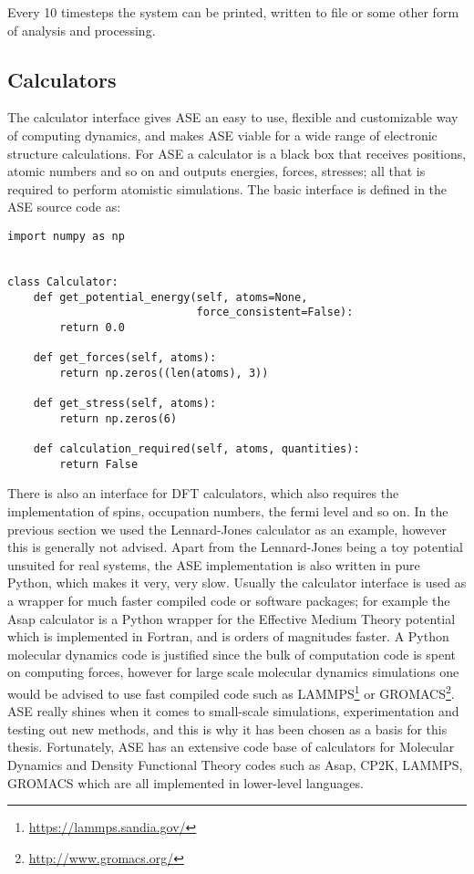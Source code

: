 Every 10 timesteps the system can be printed, written to file
or some other form of analysis and processing.

\subsection{Calculators}
The calculator interface gives ASE an easy to use,
flexible and customizable way of computing dynamics,
and makes ASE viable for a wide range of electronic structure calculations.
For ASE a calculator is a black box that receives positions, atomic
numbers and so on and outputs energies, forces, stresses;
all that is required to perform atomistic simulations.
The basic interface is defined in the ASE source code as:

\begin{verbatim}
import numpy as np


class Calculator:
    def get_potential_energy(self, atoms=None, 
                             force_consistent=False):
        return 0.0

    def get_forces(self, atoms):
        return np.zeros((len(atoms), 3))

    def get_stress(self, atoms):
        return np.zeros(6)

    def calculation_required(self, atoms, quantities):
        return False
\end{verbatim}

There is also an interface for DFT calculators, which also
requires the implementation of spins, occupation numbers,
the fermi level and so on.
\newline
\newline
In the previous section we used the Lennard-Jones calculator
as an example, however this is generally not advised.
Apart from the Lennard-Jones being a toy potential unsuited
for real systems, the ASE implementation is also written in pure
Python, which makes it very, very slow.
Usually the calculator interface is used as a wrapper for much faster
compiled code or software packages; for example the
Asap calculator is a Python wrapper for the Effective Medium Theory
potential which is implemented in Fortran, and is orders of magnitudes
faster. A Python molecular dynamics code is justified
since the bulk of computation code is spent on computing forces,
however for large scale molecular dynamics simulations
one would be advised to use fast compiled code such as LAMMPS\footnote{
\url{https://lammps.sandia.gov/}} or GROMACS\footnote{
\url{http://www.gromacs.org/}}.
ASE really shines when it comes to small-scale simulations,
experimentation and testing out new methods, and this is why
it has been chosen as a basis for this thesis.
Fortunately, ASE has an extensive code base of calculators
for Molecular Dynamics and Density Functional Theory codes
such as Asap, CP2K, LAMMPS, GROMACS which are all
implemented in lower-level languages.
